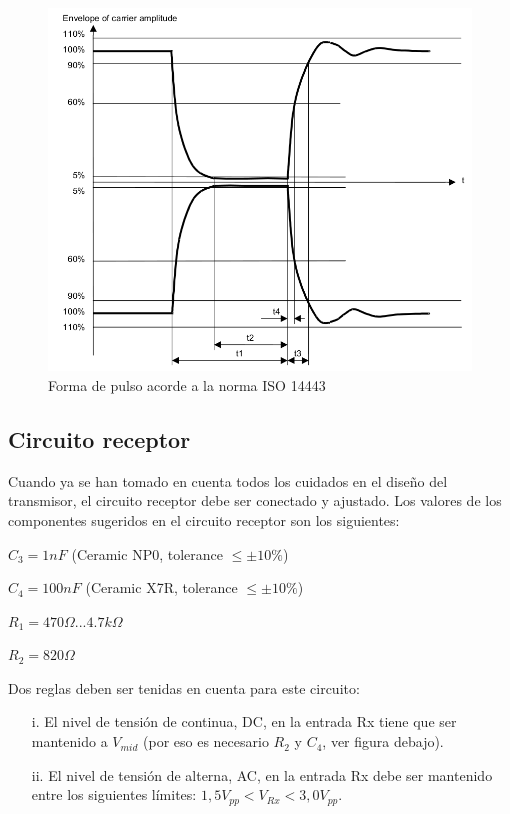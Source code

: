 \begin{figure}[H]
\centering
  \begin{center}
  \includegraphics[scale=.4]{Imagenes/anexo1.png} 
  \end{center}
  \caption{Forma de pulso acorde a la norma ISO 14443}\label{Fig:HW} 
\end{figure}


\subsection{Circuito receptor}

Cuando ya se han tomado en cuenta todos los cuidados en el diseño del transmisor, el circuito receptor debe ser conectado y ajustado.
Los valores de los componentes sugeridos en el circuito receptor son los siguientes:

\bigskip
	$C_{3} = 1nF$ 			(Ceramic NP0, tolerance $\leq \pm 10\%$) 
	
	$C_{4} = 100nF$ 			(Ceramic X7R, tolerance $\leq \pm 10\%$) 
	
	$R_{1} = 470 \Omega {...} 4.7 k \Omega $ 
	
	$R_{2} = 820 \Omega $
	
\bigskip
Dos reglas deben ser tenidas en cuenta para este circuito:

\begin{itemize}
\item[i.] El nivel de tensión de continua, DC, en la entrada Rx tiene que ser mantenido a $V_{mid}$ (por eso es necesario $R_{2}$ y $C_{4}$, ver figura debajo).
\item[ii.] El nivel de tensión de alterna, AC, en la entrada Rx debe ser mantenido entre los siguientes límites: $1,5V_{pp} < V_{Rx} < 3,0V_{pp}$.
\end{itemize}	

